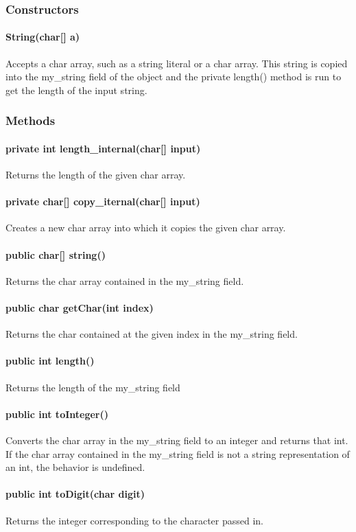 \begin{homeworkProblem}
	\subsubsection{Constructors}
	\paragraph{String(char[] a)}
	Accepts a char array, such as a string literal or a char array. This string is copied into the my\_string field of the object and the private length() method is run to get the length of the input string.
	
	\subsubsection{Methods}
	\paragraph{private int length\_internal(char[] input)}
	Returns the length of the given char array.
	\paragraph{private char[] copy\_iternal(char[] input)}
	Creates a new char array into which it copies the given char array.
	\paragraph{public char[] string()}
	Returns the char array contained in the my\_string field.
	\paragraph{public char getChar(int index)}
	Returns the char contained at the given index in the my\_string field.
	\paragraph{public int length()}
	Returns the length of the my\_string field
	\paragraph{public int toInteger()}
	Converts the char array in the my\_string field to an integer and returns that int. If the char array contained in the my\_string field is not a  string representation of an int, the behavior is undefined.
	\paragraph{public int toDigit(char digit)}
	Returns the integer corresponding to the character passed in.

\end{homeworkProblem}
